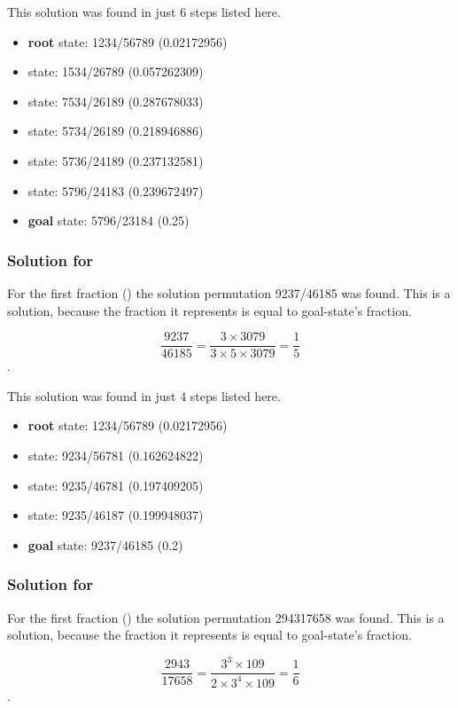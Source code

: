 \documentclass{article}
\begin{document}
This solution was found in just 6 steps listed here.

\begin{itemize}
  \item \textbf{root} state: 1234/56789 (0.02172956) 
  \item state: 1534/26789 (0.057262309)
  \item state: 7534/26189 (0.287678033)
  \item state: 5734/26189 (0.218946886)
  \item state: 5736/24189 (0.237132581)
  \item state: 5796/24183 (0.239672497)
  \item \textbf{goal} state: 5796/23184 (0.25)
\end{itemize}

\subsubsection{Solution for }

For the first fraction () the solution permutation 9237/46185 was
found. This is a solution, because the fraction it represents is equal to
goal-state's fraction.

\[\frac{9237}{46185} = \frac{3 \times 3079}{3 \times 5 \times 3079}
= \frac{1}{5}\].

This solution was found in just 4 steps listed here.

\begin{itemize}
  \item \textbf{root} state: 1234/56789 (0.02172956) 
  \item state: 9234/56781 (0.162624822)
  \item state: 9235/46781 (0.197409205)
  \item state: 9235/46187 (0.199948037)
  \item \textbf{goal} state: 9237/46185 (0.2)
\end{itemize}

\subsubsection{Solution for }

For the first fraction () the solution permutation 294317658 was
found. This is a solution, because the fraction it represents is equal to
goal-state's fraction.

\[\frac{2943}{17658} = \frac{3^3 \times 109}{2 \times 3^4 \times 109}
= \frac{1}{6}\].
\end{document}
